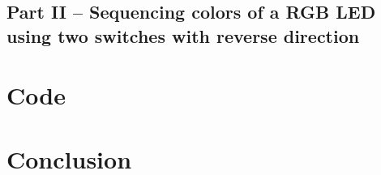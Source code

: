 \documentclass[11pt,a4paper]{article}
\begin{document}
\subsubsection{}

\subsection{Part II – Sequencing colors of a RGB LED using two switches with reverse direction}

\section{Code}

\section{Conclusion}
\end{document}
